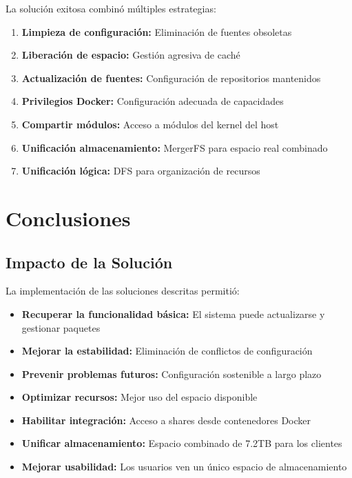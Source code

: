 \documentclass[12pt, a4paper]{article}
\begin{document}
La solución exitosa combinó múltiples estrategias:

\begin{enumerate}
    \item \textbf{Limpieza de configuración:} Eliminación de fuentes obsoletas
    \item \textbf{Liberación de espacio:} Gestión agresiva de caché
    \item \textbf{Actualización de fuentes:} Configuración de repositorios mantenidos
    \item \textbf{Privilegios Docker:} Configuración adecuada de capacidades
    \item \textbf{Compartir módulos:} Acceso a módulos del kernel del host
    \item \textbf{Unificación almacenamiento:} MergerFS para espacio real combinado
    \item \textbf{Unificación lógica:} DFS para organización de recursos
\end{enumerate}

\clearpage

\section{Conclusiones}
\label{sec:conclusiones}

\subsection{Impacto de la Solución}
\label{subsec:impacto}

La implementación de las soluciones descritas permitió:

\begin{itemize}
    \item \textbf{Recuperar la funcionalidad básica:} El sistema puede actualizarse y gestionar paquetes
    \item \textbf{Mejorar la estabilidad:} Eliminación de conflictos de configuración
    \item \textbf{Prevenir problemas futuros:} Configuración sostenible a largo plazo
    \item \textbf{Optimizar recursos:} Mejor uso del espacio disponible
    \item \textbf{Habilitar integración:} Acceso a shares desde contenedores Docker
    \item \textbf{Unificar almacenamiento:} Espacio combinado de 7.2TB para los clientes
    \item \textbf{Mejorar usabilidad:} Los usuarios ven un único espacio de almacenamiento
\end{itemize}
\end{document}
